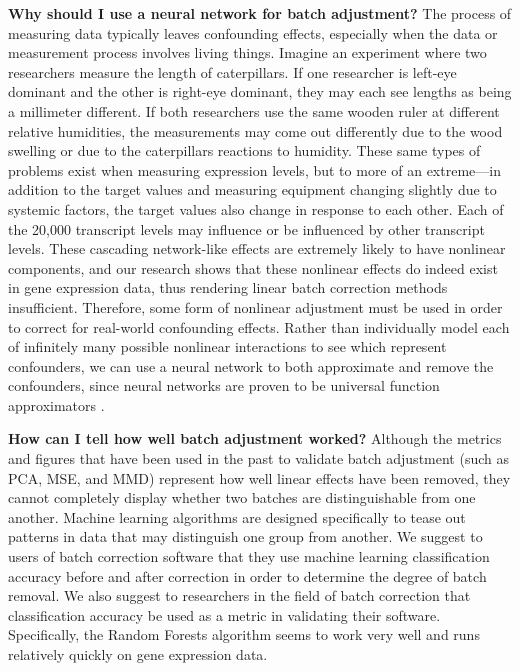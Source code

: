 \documentclass[12pt]{article}
\begin{document}
\textbf{Why should I use a neural network for batch adjustment?}
The process of measuring data typically leaves confounding effects, especially when the data or measurement process involves living things.
Imagine an experiment where two researchers measure the length of caterpillars.
If one researcher is left-eye dominant and the other is right-eye dominant, they may each see lengths as being a millimeter different.
If both researchers use the same wooden ruler at different relative humidities, the measurements may come out differently due to the wood swelling or due to the caterpillars reactions to humidity.
These same types of problems exist when measuring expression levels, but to more of an extreme---in addition to the target values and measuring equipment changing slightly due to systemic factors, the target values also change in response to each other.
Each of the 20,000 transcript levels may influence or be influenced by other transcript levels.
These cascading network-like effects are extremely likely to have nonlinear components, and our research shows that these nonlinear effects do indeed exist in gene expression data, thus rendering linear batch correction methods insufficient.
Therefore, some form of nonlinear adjustment must be used in order to correct for real-world confounding effects.
Rather than individually model each of infinitely many possible nonlinear interactions to see which represent confounders, we can use a neural network to both approximate and remove the confounders, since neural networks are proven to be universal function approximators \citep{csaji_approximation_2001}.

\textbf{How can I tell how well batch adjustment worked?}
Although the metrics and figures that have been used in the past to validate batch adjustment (such as PCA, MSE, and MMD) represent how well linear effects have been removed, they cannot completely display whether two batches are distinguishable from one another.
Machine learning algorithms are designed specifically to tease out patterns in data that may distinguish one group from another.
We suggest to users of batch correction software that they use machine learning classification accuracy before and after correction in order to determine the degree of batch removal.
We also suggest to researchers in the field of batch correction that classification accuracy be used as a metric in validating their software.
Specifically, the Random Forests algorithm \citep{tin_kam_ho_random_1995} seems to work very well and runs relatively quickly on gene expression data.
\end{document}
